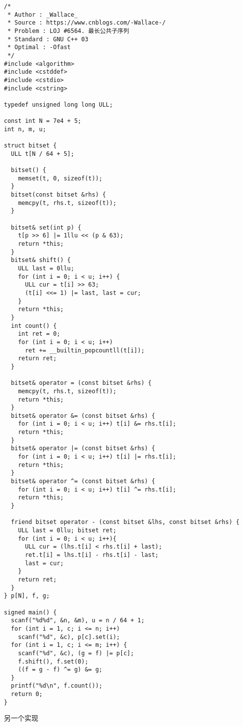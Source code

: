 \documentclass[12pt]{ctexart}
\begin{document}
\begin{lstlisting}
/*
 * Author : _Wallace_
 * Source : https://www.cnblogs.com/-Wallace-/
 * Problem : LOJ #6564. 最长公共子序列
 * Standard : GNU C++ 03
 * Optimal : -Ofast
 */
#include <algorithm>
#include <cstddef>
#include <cstdio>
#include <cstring>

typedef unsigned long long ULL;

const int N = 7e4 + 5;
int n, m, u;

struct bitset {
  ULL t[N / 64 + 5];

  bitset() {
    memset(t, 0, sizeof(t));
  }
  bitset(const bitset &rhs) {
    memcpy(t, rhs.t, sizeof(t));
  }

  bitset& set(int p) {
    t[p >> 6] |= 1llu << (p & 63);
    return *this;
  }
  bitset& shift() {
    ULL last = 0llu;
    for (int i = 0; i < u; i++) {
      ULL cur = t[i] >> 63;
      (t[i] <<= 1) |= last, last = cur;
    }
    return *this;
  }
  int count() {
    int ret = 0;
    for (int i = 0; i < u; i++)
      ret += __builtin_popcountll(t[i]);
    return ret;
  }

  bitset& operator = (const bitset &rhs) {
    memcpy(t, rhs.t, sizeof(t));
    return *this;
  }
  bitset& operator &= (const bitset &rhs) {
    for (int i = 0; i < u; i++) t[i] &= rhs.t[i];
    return *this;
  }
  bitset& operator |= (const bitset &rhs) {
    for (int i = 0; i < u; i++) t[i] |= rhs.t[i];
    return *this;
  }
  bitset& operator ^= (const bitset &rhs) {
    for (int i = 0; i < u; i++) t[i] ^= rhs.t[i];
    return *this;
  }

  friend bitset operator - (const bitset &lhs, const bitset &rhs) {
    ULL last = 0llu; bitset ret;
    for (int i = 0; i < u; i++){
      ULL cur = (lhs.t[i] < rhs.t[i] + last);
      ret.t[i] = lhs.t[i] - rhs.t[i] - last;
      last = cur;
    }
    return ret;
  }
} p[N], f, g;

signed main() {
  scanf("%d%d", &n, &m), u = n / 64 + 1;
  for (int i = 1, c; i <= n; i++)
    scanf("%d", &c), p[c].set(i);
  for (int i = 1, c; i <= m; i++) {
    scanf("%d", &c), (g = f) |= p[c];
    f.shift(), f.set(0);
    ((f = g - f) ^= g) &= g;
  }
  printf("%d\n", f.count());
  return 0;
}
\end{lstlisting}

另一个实现
\end{document}
